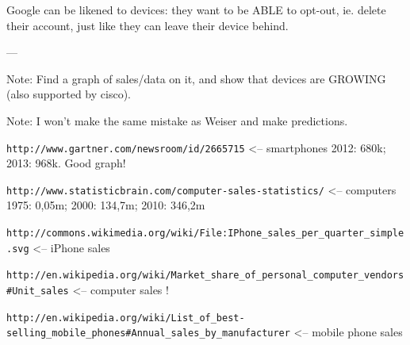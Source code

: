 Google can be likened to devices: they want to be ABLE to opt-out, ie. delete their account, just like they can leave their device behind.

---

Note: Find a graph of sales/data on it, and show that devices are GROWING (also supported by cisco).

Note: I won't make the same mistake as Weiser and make predictions.

\verb+http://www.gartner.com/newsroom/id/2665715+ <-- smartphones 2012: 680k; 2013: 968k. Good graph!

\verb+http://www.statisticbrain.com/computer-sales-statistics/+ <-- computers 1975: 0,05m; 2000: 134,7m; 2010: 346,2m

\verb+http://commons.wikimedia.org/wiki/File:IPhone_sales_per_quarter_simple.svg+ <-- iPhone sales

\verb+http://en.wikipedia.org/wiki/Market_share_of_personal_computer_vendors#Unit_sales+ <-- computer sales ! 

\verb+http://en.wikipedia.org/wiki/List_of_best-selling_mobile_phones#Annual_sales_by_manufacturer+ <-- mobile phone sales